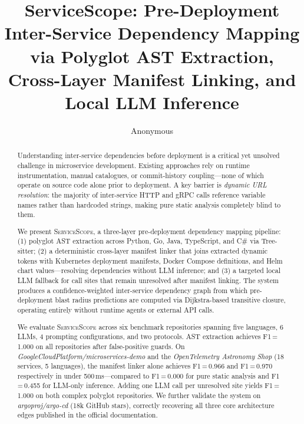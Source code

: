 \documentclass[runningheads]{llncs}
\begin{document}
\title{ServiceScope: Pre-Deployment Inter-Service Dependency Mapping
via Polyglot AST Extraction, Cross-Layer Manifest Linking, and Local LLM Inference}

\author{Anonymous}

\maketitle

\begin{abstract}
Understanding inter-service dependencies before deployment is a critical yet
unsolved challenge in microservice development. Existing approaches rely on
runtime instrumentation, manual catalogues, or commit-history coupling---none
of which operate on source code alone prior to deployment. A key barrier is
\emph{dynamic URL resolution}: the majority of inter-service HTTP and gRPC
calls reference variable names rather than hardcoded strings, making pure
static analysis completely blind to them.

We present \textsc{ServiceScope}, a three-layer pre-deployment dependency
mapping pipeline: (1) polyglot AST extraction across Python, Go, Java,
TypeScript, and C\# via Tree-sitter; (2) a deterministic cross-layer manifest
linker that joins extracted dynamic tokens with Kubernetes deployment
manifests, Docker Compose definitions, and Helm chart values---resolving
dependencies without LLM inference; and (3) a targeted local LLM fallback
for call sites that remain unresolved after manifest linking. The system
produces a confidence-weighted inter-service dependency graph from which
pre-deployment blast radius predictions are computed via Dijkstra-based
transitive closure, operating entirely without runtime agents or external
API calls.

We evaluate \textsc{ServiceScope} across six benchmark repositories spanning
five languages, 6 LLMs, 4 prompting configurations, and two protocols. AST
extraction achieves F1\,=\,1.000 on all repositories after false-positive
guards. On \emph{GoogleCloudPlatform/microservices-demo} and the
\emph{OpenTelemetry Astronomy Shop} (18 services, 5 languages), the manifest
linker alone achieves F1\,=\,0.966 and F1\,=\,0.970 respectively in under
500\,ms---compared to F1\,=\,0.000 for pure static analysis and
F1\,=\,0.455 for LLM-only inference. Adding one LLM call per unresolved
site yields F1\,=\,1.000 on both complex polyglot repositories. We further
validate the system on \emph{argoproj/argo-cd} (18k GitHub stars), correctly
recovering all three core architecture edges published in the official
documentation.
\end{abstract}
\end{document}
